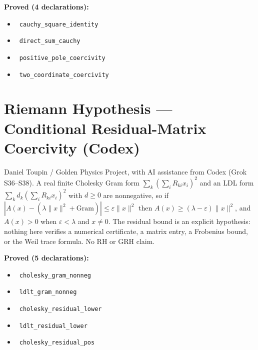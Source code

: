 \documentclass{report}
\theoremstyle{definition}
\begin{document}
\begin{itemize}
\begin{itemize}
\noindent\textbf{Proved (4 declarations):}
\begin{itemize}
  \item {}\leanok\ \texttt{cauchy\_square\_identity}
  \item {}\leanok\ \texttt{direct\_sum\_cauchy}
  \item {}\leanok\ \texttt{positive\_pole\_coercivity}
  \item {}\leanok\ \texttt{two\_coordinate\_coercivity}
\end{itemize}

\section{Riemann Hypothesis --- Conditional Residual-Matrix Coercivity (Codex)}
Daniel Toupin / Golden Physics Project, with AI assistance from Codex (Grok S36--S38). A real finite Cholesky Gram form $\sum_k(\sum_iR_{ki}x_i)^2$ and an LDL form $\sum_kd_k(\sum_iR_{ki}x_i)^2$ with $d\ge0$ are nonnegative, so if $|A(x)-(\lambda\|x\|^2+\text{Gram})|\le\varepsilon\|x\|^2$ then $A(x)\ge(\lambda-\varepsilon)\|x\|^2$, and $A(x)>0$ when $\varepsilon<\lambda$ and $x\neq0$. The residual bound is an explicit hypothesis: nothing here verifies a numerical certificate, a matrix entry, a Frobenius bound, or the Weil trace formula. No RH or GRH claim.

\noindent\textbf{Proved (5 declarations):}
\begin{itemize}
  \item {}\leanok\ \texttt{cholesky\_gram\_nonneg}
  \item {}\leanok\ \texttt{ldlt\_gram\_nonneg}
  \item {}\leanok\ \texttt{cholesky\_residual\_lower}
  \item {}\leanok\ \texttt{ldlt\_residual\_lower}
  \item {}\leanok\ \texttt{cholesky\_residual\_pos}
\end{itemize}


\end{itemize}
\end{itemize}
\end{document}

